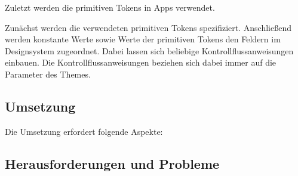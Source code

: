 Zuletzt werden die primitiven Tokens in Apps verwendet.

Zunächst werden die verwendeten primitiven Tokens spezifiziert.
Anschließend werden konstante Werte sowie Werte der primitiven Tokens den Feldern im Designsystem zugeordnet.
Dabei lassen sich beliebige Kontrollflussanweisungen einbauen.
Die Kontrollflussanweisungen beziehen sich dabei immer auf die Parameter des Themes.

\subsection{Umsetzung}\label{subsec:umsetzung}
Die Umsetzung erfordert folgende Aspekte:
\lipsum[5]

\subsection{Herausforderungen und Probleme}\label{subsec:herausforderungen-und-probleme}
\lipsum[5]
